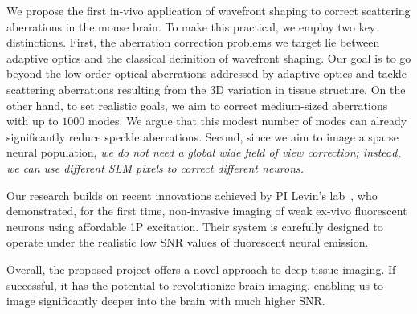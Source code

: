  We propose the first in-vivo application of wavefront shaping to correct scattering aberrations in the mouse brain. To make this practical, we employ two key distinctions. First, the aberration correction problems we target lie between adaptive optics and the classical definition of wavefront shaping. Our goal is to go beyond the low-order optical aberrations addressed by adaptive optics and tackle scattering aberrations resulting from the 3D variation in tissue structure. On the other hand, to set realistic goals, we aim to correct medium-sized aberrations with up to $1000$ modes. We argue that this modest number of modes can already significantly reduce speckle aberrations.
 Second, since we aim to image a sparse neural population, {\em we do not need a global wide field of view correction; instead, we can use different SLM pixels to correct different neurons.}
 
 Our research builds on recent innovations achieved by PI Levin's lab~\cite{DrorNatureComm24}, who demonstrated, for the first time, non-invasive imaging of weak ex-vivo fluorescent neurons using affordable 1P excitation. Their system is carefully designed to operate under the realistic low SNR values of fluorescent neural emission.
  
Overall, the proposed project offers a novel approach to deep tissue imaging. If successful, it has the potential to revolutionize brain imaging, enabling us to image significantly deeper into the brain with much higher SNR.
 
